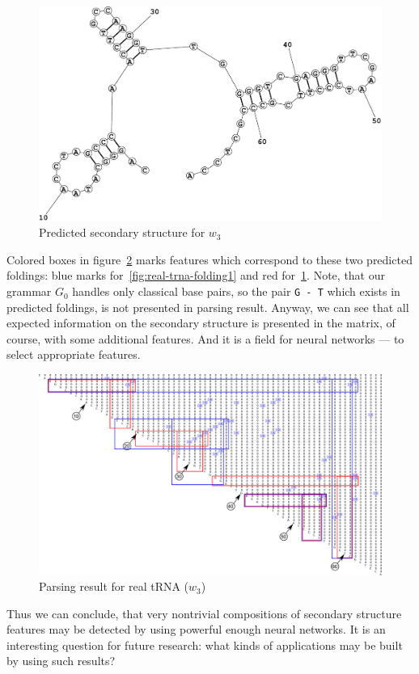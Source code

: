 \documentclass[a4paper,twoside]{article}
\begin{document}
\begin{figure}
\centering
\includegraphics[width=.45\textwidth]{figures/Fold2.pdf}
\caption{Predicted secondary structure for $w_3$}
\label{fig:real-trna-folding2}
\end{figure}

Colored boxes in figure~\ref{fig:real-trna} marks features which correspond to these two predicted foldings: blue marks for~\ref{fig:real-trna-folding1} and red for~\ref{fig:real-trna-folding2}.
Note, that our grammar $G_0$ handles only classical base pairs, so the pair \verb|G - T| which exists in predicted foldings, is not presented in parsing result.
Anyway, we can see that all expected information on the secondary structure is presented in the matrix, of course, with some additional features.
And it is a field for neural networks --- to select appropriate features.

\begin{figure}
\centering
\includegraphics[width=.98\textwidth]{figures/0m.pdf}
\caption{Parsing result for real tRNA ($w_3$)}
\label{fig:real-trna}
\end{figure}

Thus we can conclude, that very nontrivial compositions of secondary structure features may be detected by using powerful enough neural networks.
It is an interesting question for future research: what kinds of applications may be built by using such results?
\end{document}
